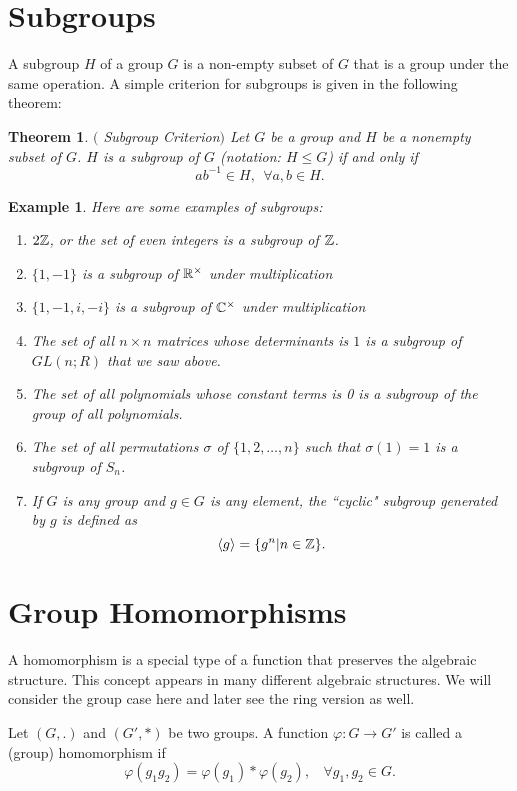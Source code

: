 \documentclass[12pt]{article}
\theoremstyle{plain}
\newtheorem{example}{Example}
\newtheorem{theorem}{Theorem}
\theoremstyle{definition}
\theoremstyle{remark}
\begin{document}
\section{Subgroups}
A subgroup $H$ of a group $G$ is a non-empty subset of $G$ that is a group under the same operation. A simple criterion for subgroups is given in the following theorem:
\begin{theorem}$($ Subgroup Criterion$)$
Let $G$ be a group and $H$ be a nonempty subset of $G$. $H$ is a subgroup of $G$ (notation: $H\leq G$) if and only if
$$ab^{-1} \in H, \:\: \forall a,b\in H. $$
\end{theorem}
\begin{example}
Here are some examples of subgroups:
\begin{enumerate}
    \item $2\mathbb{Z}$, or the set of even integers is a subgroup of $\mathbb{Z}$.
    \item $\{1,-1\}$ is a subgroup of $\mathbb{R}^{\times}$ under multiplication
    \item $\{1,-1, i, -i\}$ is a subgroup of $\mathbb{C}^{\times}$ under multiplication
    \item The set of all $n\times n$ matrices whose determinants is $1$ is a subgroup of $GL(n;R)$ that we saw above.
    \item The set of all polynomials whose constant terms is 0 is a subgroup of the group of all polynomials.
    \item The set of all permutations $\sigma$ of $\{1,2, \dots, n\}$ such that $\sigma(1)=1$ is a subgroup of $S_n$.
    \item If $G$ is any group and $g\in G$ is any element, the ``cyclic" subgroup generated by $g$ is defined as
    $$\langle g\rangle = \{g^n|n\in \mathbb{Z}\}.$$
\end{enumerate}
\end{example}
\section{Group Homomorphisms}
A homomorphism is a special type of a function that preserves the algebraic structure. This concept appears in many different algebraic structures. We will consider the group case here and later see the ring version as well.

Let $(G,.)$ and $(G',*)$ be two groups. A function $\varphi:G\rightarrow G'$ is called a (group) homomorphism if
$$\varphi(g_1g_2) = \varphi(g_1)*\varphi(g_2), \:\:\:\: \forall g_1, g_2 \in G.$$
\end{document}

